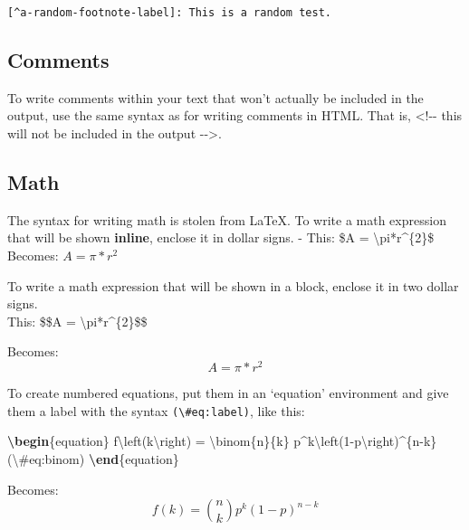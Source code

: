 \documentclass[a4paper, twoside]{templates/ociamthesis}
\newenvironment{Shaded}{\begin{snugshade}}{\end{snugshade}}
\newcommand{\ExtensionTok}[1]{#1}
\newcommand{\KeywordTok}[1]{\textcolor[rgb]{0.13,0.29,0.53}{\textbf{#1}}}
\newcommand{\NormalTok}[1]{#1}
\newcommand{\SpecialCharTok}[1]{\textcolor[rgb]{0.00,0.00,0.00}{#1}}
\newcommand{\SpecialStringTok}[1]{\textcolor[rgb]{0.31,0.60,0.02}{#1}}
\renewenvironment{Shaded}
{
  \vspace{10pt}%
  \begin{snugshade}%
}{%
  \end{snugshade}%
  \vspace{8pt}%
}
\theoremstyle{definition}
\theoremstyle{definition}
\theoremstyle{definition}
\theoremstyle{definition}
\theoremstyle{remark}
\begin{document}
\texttt{{[}\^{}a-random-footnote-label{]}:\ This\ is\ a\ random\ test.}

\hypertarget{comments}{%
\subsection{Comments}\label{comments}}

To write comments within your text that won't actually be included in the output, use the same syntax as for writing comments in HTML. That is, \textless!-\/- this will not be included in the output -\/-\textgreater.

\hypertarget{math}{%
\subsection{Math}\label{math}}

The syntax for writing math is stolen from LaTeX. To write a math expression that will be shown \textbf{inline}, enclose it in dollar signs.
- This: \$A = \textbackslash pi*r\^{}\{2\}\$ Becomes: \(A = \pi*r^{2}\)

To write a math expression that will be shown in a block, enclose it in two dollar signs.\\
This: \$\$A = \textbackslash pi*r\^{}\{2\}\$\$

Becomes:
\[A = \pi*r^{2}\]

To create numbered equations, put them in an `equation' environment and give them a label with the syntax \texttt{(\textbackslash{}\#eq:label)}, like this:

\begin{Shaded}
\begin{Highlighting}[]
\KeywordTok{\textbackslash{}begin}\NormalTok{\{}\ExtensionTok{equation}\NormalTok{\}}\SpecialStringTok{ }
\SpecialStringTok{  f}\SpecialCharTok{\textbackslash{}left}\SpecialStringTok{(k}\SpecialCharTok{\textbackslash{}right}\SpecialStringTok{) = }\SpecialCharTok{\textbackslash{}binom}\SpecialStringTok{\{n\}\{k\} p\^{}k}\SpecialCharTok{\textbackslash{}left}\SpecialStringTok{(1{-}p}\SpecialCharTok{\textbackslash{}right}\SpecialStringTok{)\^{}\{n{-}k\}}
\SpecialStringTok{  (}\SpecialCharTok{\textbackslash{}\#}\SpecialStringTok{eq:binom)}
\KeywordTok{\textbackslash{}end}\NormalTok{\{}\ExtensionTok{equation}\NormalTok{\} }
\end{Highlighting}
\end{Shaded}

Becomes:
\begin{equation}
f\left(k\right)=\binom{n}{k}p^k\left(1-p\right)^{n-k}
\label{eq:binom}
\end{equation}
\end{document}

